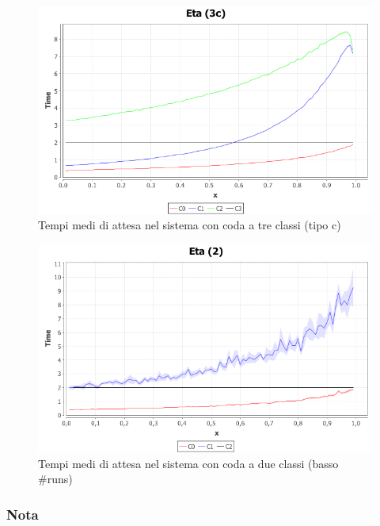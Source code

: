 \begin{figure}[!h]{
	\begin{center}
	   \includegraphics[width=\textwidth]{figures/MG1PRIO3c[mu=2,runs=10000,arrivals=1000].png}
	\end{center}}
	\caption{Tempi medi di attesa nel sistema con coda a tre classi (tipo c)}
	\label{fig:mg1prio3c}
\end{figure}


\begin{figure}[!h]{
	\begin{center}
	   \includegraphics[width=\textwidth]{figures/mg1prio2low.png}
	\end{center}}
	\caption{Tempi medi di attesa nel sistema con coda a due classi (basso \#runs)}
	\label{fig:mg1prio2low}
\end{figure}

\subsubsection{Nota}

